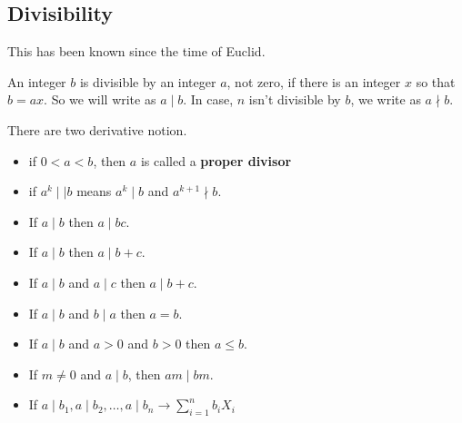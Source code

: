 \documentclass[11pt]{article}
\begin{document}
\subsection{Divisibility}
This has been known since the time of Euclid. \\
\begin{definition}
    An integer $b$ is divisible by an integer $a$, not zero, if there is an integer $x$ so that $b = ax$. So we will write as $a \mid b$. In case, $n$ isn't divisible by $b$, we write as $a \nmid b$.
\end{definition}

There are two derivative notion.\begin{itemize}
    \item if $0 < a < b$, then $a$ is called a \textbf{proper divisor} \item if $a^k \mid\mid b$ means $a^k \mid b$ and $a^{k + 1} \nmid b$.
\end{itemize}
\begin{theorem}
    \begin{itemize}
        \item If $a \mid b$ then $a \mid bc$.
        \item If $a \mid b$ then $a \mid b + c$.
        \item If $a \mid b$ and $a \mid c$ then $a \mid b + c$.
        \item If $a \mid b$ and $b \mid a$ then $a = b$.
        \item If $a \mid b$ and $a > 0$ and $b > 0$ then $a \leq b$.
        \item If $m \neq 0$ and $a \mid b$, then $am \mid bm$.
        \item If $a \mid b_1, a \mid b_2, \ldots, a \mid b_n \rightarrow \sum_{i= 1}^{n} b_i
                  X_i$
    \end{itemize}
\end{theorem}
\end{document}

